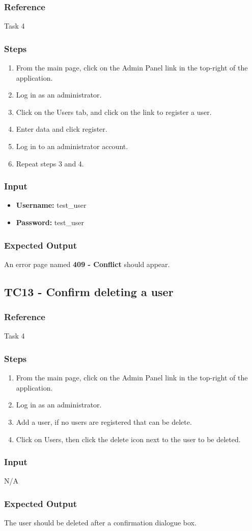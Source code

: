 \subsubsection{Reference}

Task 4

\subsubsection{Steps}
\begin{enumerate}
			\item From the main page, click on the Admin Panel link in the top-right of the application.
	\item Log in as an administrator.
	\item Click on the Users tab, and click on the link to register a user.
	\item Enter data and click register.
	\item Log in to an administrator account.
	\item Repeat steps 3 and 4.
\end{enumerate}	
\subsubsection{Input}
\begin{itemize}
\item \textbf{Username: } test\_user
\item \textbf{Password: } test\_user	
\end{itemize}
\subsubsection{Expected Output}
An error page named \textbf{409 - Conflict} should appear.
\subsection{TC13 - Confirm deleting a user}

\subsubsection{Reference}

Task 4

\subsubsection{Steps}
\begin{enumerate}
			\item From the main page, click on the Admin Panel link in the top-right of the application.
	\item Log in as an administrator.
	\item Add a user, if no users are registered that can be delete.
	\item Click on Users, then click the delete icon next to the user to be deleted.
\end{enumerate}	
\subsubsection{Input}
N/A
\subsubsection{Expected Output}
The user should be deleted after a confirmation dialogue box.
